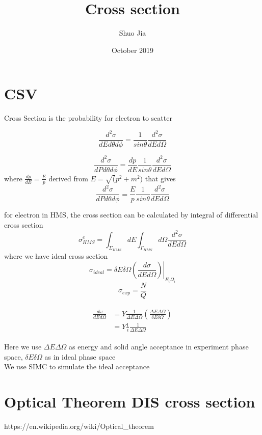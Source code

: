 \documentclass{article}
\title{Cross section}
\author{Shuo Jia}
\date{October 2019}
\begin{document}
\maketitle

\section{CSV}
Cross Section is the probability for electron to scatter 

\begin{equation}
  \frac{d^2\sigma}{dEd\theta d\phi} = \frac{1}{sin\theta}\frac{d^2\sigma}{dEd\Omega}
\end{equation}

\begin{equation}
  \frac{d^2\sigma}{dPd\theta d\phi} = \frac{dp}{dE} \frac{1}{sin\theta} \frac{d^2\sigma}{dEd\Omega}
\end{equation}
where 
$\frac{dp}{dE} = \frac{E}{p}$
derived from 
$E = \sqrt(p^2+m^2)$
that gives
\begin{equation}
  \frac{d^2\sigma}{dPd\theta d\phi} = \frac{E}{p} \frac{1}{sin\theta} \frac{d^2\sigma}{dEd\Omega}
\end{equation}

for electron in HMS, the cross section can be calculated by integral of differential cross section
\begin{equation}
  \sigma^e_{HMS} = \int_{\Sigma_{HMS}}dE\int_{\Gamma_{HMS}}d\Omega \frac{d^2\sigma}{dEd\Omega}
\end{equation}
where we have ideal cross section
\begin{equation}
  \sigma_{ideal} = \left.\delta E \delta \Omega \left( \frac{d\sigma}{dEd\Omega} \right) \right\vert_{E_i\Omega_i}
\end{equation}
\begin{equation}
  \sigma_{exp} = \frac{N}{Q}
\end{equation}

\begin{align}
  \begin{split}
    \frac{d\omega}{dEd\Omega} &= Y\frac{1}{\Delta E\Delta \Omega} \left( \frac{\Delta E \Delta \Omega}{\delta E\delta \Omega}\right) \\
                              &= Y \frac{1}{\epsilon} \frac{1}{\Delta E\Delta \Omega}
  \end{split}
\end{align}

Here we use $\Delta E\Delta \Omega$ as energy and solid angle acceptance in experiment phase space, $\delta E\delta \Omega$ as in ideal phase space
\\
We use SIMC to simulate the ideal acceptance
\section{Optical Theorem DIS cross section}
https://en.wikipedia.org/wiki/Optical_theorem
\begin{thebibliography}{unsrt}
  \bibitem{}
\end{thebibliography}
\end{document}
